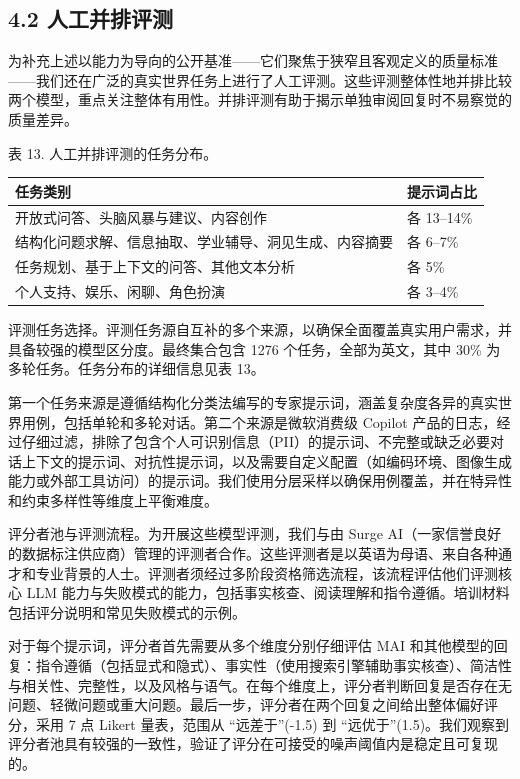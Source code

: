 \subsection{4.2 人工并排评测}\label{human-sidebyside-evaluations}

为补充上述以能力为导向的公开基准——它们聚焦于狭窄且客观定义的质量标准——我们还在广泛的真实世界任务上进行了人工评测。这些评测整体性地并排比较两个模型，重点关注整体有用性。并排评测有助于揭示单独审阅回复时不易察觉的质量差异。

表 13. 人工并排评测的任务分布。

{\def\LTcaptype{none} %
\begin{longtable}[]{@{}|l|l|@{}}
\toprule\noalign{}
\endhead
\bottomrule\noalign{}
\endlastfoot
\hline
任务类别 & 提示词占比 \\
\hline
开放式问答、头脑风暴与建议、内容创作 & 各 13--14\% \\
\hline
结构化问题求解、信息抽取、学业辅导、洞见生成、内容摘要 & 各 6--7\% \\
\hline
任务规划、基于上下文的问答、其他文本分析 & 各 5\% \\
\hline
个人支持、娱乐、闲聊、角色扮演 & 各 3--4\% \\
\hline
\end{longtable}
}

评测任务选择。评测任务源自互补的多个来源，以确保全面覆盖真实用户需求，并具备较强的模型区分度。最终集合包含 1276 个任务，全部为英文，其中 30\% 为多轮任务。任务分布的详细信息见表 13。

第一个任务来源是遵循结构化分类法编写的专家提示词，涵盖复杂度各异的真实世界用例，包括单轮和多轮对话。第二个来源是微软消费级 Copilot 产品的日志，经过仔细过滤，排除了包含个人可识别信息（PII）的提示词、不完整或缺乏必要对话上下文的提示词、对抗性提示词，以及需要自定义配置（如编码环境、图像生成能力或外部工具访问）的提示词。我们使用分层采样以确保用例覆盖，并在特异性和约束多样性等维度上平衡难度。

评分者池与评测流程。为开展这些模型评测，我们与由 Surge AI（一家信誉良好的数据标注供应商）管理的评测者合作。这些评测者是以英语为母语、来自各种通才和专业背景的人士。评测者须经过多阶段资格筛选流程，该流程评估他们评测核心 LLM 能力与失败模式的能力，包括事实核查、阅读理解和指令遵循。培训材料包括评分说明和常见失败模式的示例。

对于每个提示词，评分者首先需要从多个维度分别仔细评估 MAI 和其他模型的回复：指令遵循（包括显式和隐式）、事实性（使用搜索引擎辅助事实核查）、简洁性与相关性、完整性，以及风格与语气。在每个维度上，评分者判断回复是否存在无问题、轻微问题或重大问题。最后一步，评分者在两个回复之间给出整体偏好评分，采用 7 点 Likert 量表，范围从 ``远差于''(-1.5) 到 ``远优于''(1.5)。我们观察到评分者池具有较强的一致性，验证了评分在可接受的噪声阈值内是稳定且可复现的。

